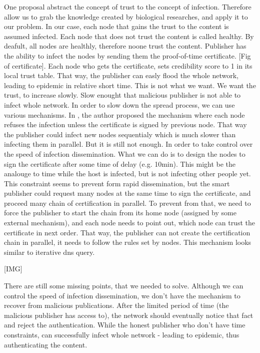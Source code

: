 \documentclass[nostrict]{szablonPG}
\begin{document}
One proposal\cite{konorski2019mitigating} abstract the concept of trust to the concept of infection. Therefore allow us to grab the knowledge created by biological researches, and apply it to our problem. In our case, each node that gains the trust to the content is assumed infected. Each node that does not trust the content is called healthy. By deafult, all nodes are healthly, therefore noone trust the content.
Publisher has the ability to infect the nodes by sending them the proof-of-time certificate. [Fig of certificate].
Each node who gets the certificate, sets credibility score to 1 in its local trust table. That way, the publisher can easly flood the whole network, leading to epidemic in relative short time.  This is not what we want. We want the trust, to increase slowly. Slow enought that malicious publisher is not able to infect whole network. In order to slow down the spread process, we can use various mechanisms. In \cite{konorski2019mitigating}, the author proposed the mechanism where each node refuses the infection unless the certificate is signed by previous node. That way the publisher could infect new nodes sequentialy which is much slower than infecting them in parallel. But it is still not enough. In order to take control over the speed of infection dissemination. What we can do is to design the nodes to sign the certificate after some time of delay (e.g. 10min). This might be the analouge to time while the host is infected, but is not infecting other people yet. This constraint seems to prevent form rapid dissemination, but the smart publisher could request many nodes at the same time to sign the certificate, and proceed many chain of certification in parallel. To prevent from that, we need to force the publisher to start the chain from its home node (assigned by some external mechanism), and each node needs to point out, which node can trust the certificate in next order. That way, the publisher can not create the certification chain in parallel, it needs to follow the rules set by nodes. This mechanism looks similar to iterative dns query.

[IMG]

There are still some missing points, that we needed to solve. Although we can control the speed of infection dissemination, we don't have the mechanism to recover from malicious publications.  After the limited period of time (the malicious publisher has access to), the network should eventually notice that fact and reject the authentication. While the honest publisher who don't have time constraints, can successfully infect whole network - leading to epidemic, thus authenticating the content. 
\end{document}
